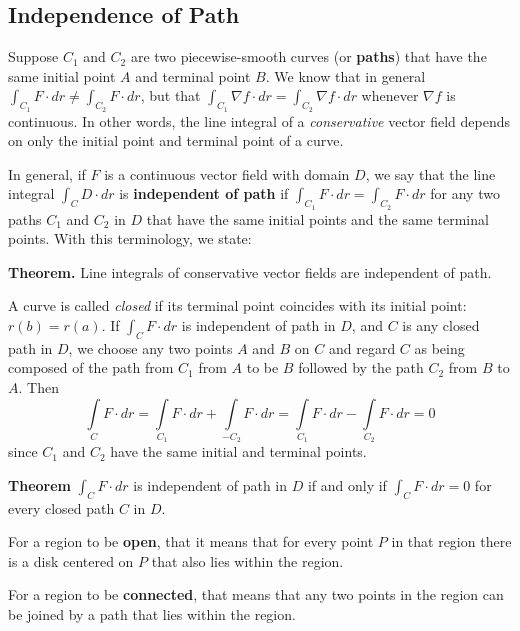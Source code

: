 \subsection{Independence of Path}

Suppose $C_{1}$ and $C_{2}$ are two piecewise-smooth curves (or \textbf{paths}) that have the same initial point $A$ and terminal point $B$. We know that in general $\int_{C_1} F \cdot dr \neq \int_{C_2} F \cdot dr $, but that $\int_{C_1} \nabla f \cdot dr = \int_{C_2} \nabla f \cdot dr $ whenever $\nabla f$ is continuous. In other words, the line integral of a \textit{conservative} vector field depends on only the initial point and terminal point of a curve.

In general, if $F$ is a continuous vector field with domain $D$, we say that the line integral $\int_C D \cdot dr$ is \textbf{independent of path} if $\int_{C_1} F \cdot dr = \int_{C_2} F \cdot dr $ for any two paths $C_1$ and $C_2$ in $D$ that have the same initial points and the same terminal points. With this terminology, we state:\linebreak

\begin{flushleft}
    \noindent\textbf{Theorem.} Line integrals of conservative vector fields are independent of path.\linebreak
\end{flushleft}

A curve is called \textit{closed} if its terminal point coincides with its initial point: $r(b) = r(a)$. If $\int_C F \cdot dr$ is independent of path in $D$, and $C$ is any closed path in $D$, we choose any two points $A$ and $B$ on $C$ and regard $C$ as being composed of the path from $C_1$ from $A$ to be $B$ followed by the path $C_2$ from $B$ to $A$. Then $$ \int\limits_C F \cdot dr = \int\limits_{C_1} F \cdot dr + \int\limits_{-C_2} F \cdot dr = \int\limits_{C_1} F \cdot dr - \int\limits_{C_2} F \cdot dr = 0 $$ since $C_1$ and $C_2$ have the same initial and terminal points.

\textbf{Theorem} $\int_C F \cdot dr$ is independent of path in $D$ if and only if $\int_C F \cdot dr = 0$ for every closed path $C$ in $D$.

For a region to be \textbf{open}, that it means that for every point $P$ in that region there is a disk centered on $P$ that also lies within the region.

For a region to be \textbf{connected}, that means that any two points in the region can be joined by a path that lies within the region.

